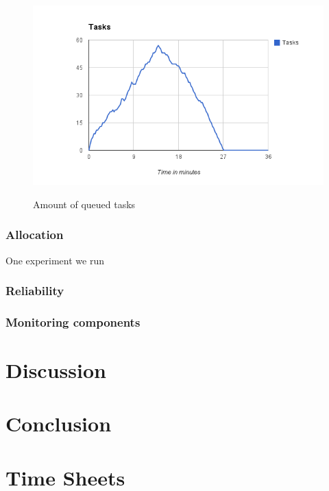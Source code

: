 \documentclass[a4paper]{IEEEtran}
\begin{document}
\begin{figure}[ht]
	\includegraphics[scale=0.5]{fig/100tasks.png}
	\label{fig:100-tasks}
	\caption{Amount of queued tasks}
\end{figure}

\subsubsection{Allocation}
One experiment we run 

\subsubsection{Reliability}

\subsubsection{Monitoring components}


\section{Discussion}

\section{Conclusion}

\appendix
\section{Time Sheets}
\end{document}
